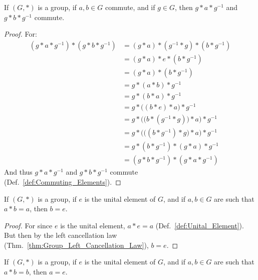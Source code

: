     \begin{theorem}
        If $(G,*)$ is a group, if $a,b\in{G}$ commute, and if $g\in{G}$, then
        $g*a*g^{\minus{1}}$ and $g*b*g^{\minus{1}}$ commute.
    \end{theorem}
    \begin{proof}
        For:
        \begin{align}
            (g*a*g^{\minus{1}})*(g*b*g^{\minus{1}})
            &=(g*a)*(g^{\minus{1}}*g)*(b*g^{\minus{1}})
            \tag{Associativity}\\
            &=(g*a)*e*(b*g^{\minus{1}})
            \tag{Inverse}\\
            &=(g*a)*(b*g^{\minus{1}})
            \tag{Identity}\\
            &=g*(a*b)*g^{\minus{1}}
            \tag{Associativity}\\
            &=g*(b*a)*g^{\minus{1}}
            \tag{Commutativity}\\
            &=g*\big((b*e)*a\big)*g^{\minus{1}}
            \tag{Identity}\\
            &=g*\Big(\big(b*(g^{\minus{1}}*g)\big)*a\Big)*g^{\minus{1}}
            \tag{Inverse}\\
            &=g*\Big(\big((b*g^{\minus{1}})*g\big)*a)*g^{\minus{1}}
            \tag{Associativity}\\
            &=g*(b*g^{\minus{1}})*(g*a)*g^{\minus{1}}
            \tag{Associativity}\\
            &=(g*b*g^{\minus{1}})*(g*a*g^{\minus{1}})
            \tag{Associativity}
        \end{align}
        And thus $g*a*g^{\minus{1}}$ and $g*b*g^{\minus{1}}$ commute
        (Def.~\ref{def:Commuting_Elements}).
    \end{proof}
    \begin{theorem}
        If $(G,*)$ is a group, if $e$ is the unital element of $G$, and if
        $a,b\in{G}$ are such that $a*b=a$, then $b=e$.
    \end{theorem}
    \begin{proof}
        For since $e$ is the unital element, $a*e=a$
        (Def.~\ref{def:Unital_Element}). But then by the left cancellation
        law (Thm.~\ref{thm:Group_Left_Cancellation_Law}), $b=e$.
    \end{proof}
    \begin{theorem}
        If $(G,*)$ is a group, if $e$ is the unital element of $G$, and if
        $a,b\in{G}$ are such that $a*b=b$, then $a=e$.
    \end{theorem}
